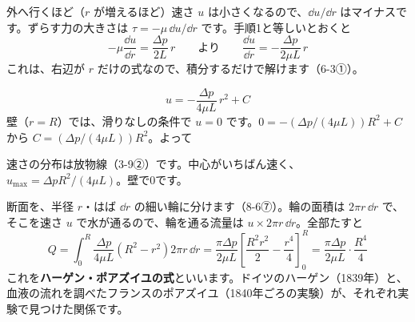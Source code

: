 外へ行くほど（$r$ が増えるほど）速さ $u$ は小さくなるので、$\dd u/\dd r$ はマイナスです。ずらす力の大きさは $\tau=-\mu\,\dd u/\dd r$ です。手順1と等しいとおくと
\[-\mu\frac{\dd u}{\dd r}=\frac{\Delta p}{2L}\,r\qquad\text{より}\qquad\frac{\dd u}{\dd r}=-\frac{\Delta p}{2\mu L}\,r\]
これは、右辺が $r$ だけの式なので、積分するだけで解けます（6-3①）。

\[u=-\frac{\Delta p}{4\mu L}\,r^2+C\]
壁（$r=R$）では、滑りなしの条件で $u=0$ です。$0=-(\Delta p/(4\mu L))R^2+C$ から $C=(\Delta p/(4\mu L))R^2$。よって

\noindent 速さの分布は放物線（3-9②）です。中心がいちばん速く、$u_{\max}=\Delta p R^2/(4\mu L)$。壁で0です。

断面を、半径 $r$・はば $\dd r$ の細い輪に分けます（8-6⑦）。輪の面積は $2\pi r\,\dd r$ で、そこを速さ $u$ で水が通るので、輪を通る流量は $u\times2\pi r\,\dd r$。全部たすと\label{ph:力-14:hp}
\[Q=\int_0^R\frac{\Delta p}{4\mu L}\left(R^2-r^2\right)2\pi r\,\dd r=\frac{\pi\Delta p}{2\mu L}\left[\frac{R^2r^2}{2}-\frac{r^4}{4}\right]_0^R=\frac{\pi\Delta p}{2\mu L}\cdot\frac{R^4}{4}\]
これを\textbf{ハーゲン・ポアズイユの式}といいます。ドイツのハーゲン（1839年）と、血液の流れを調べたフランスのポアズイユ（1840年ごろの実験）が、それぞれ実験で見つけた関係です。

